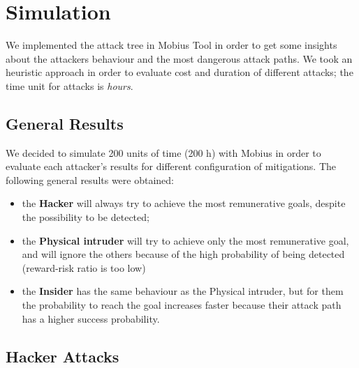 %
\chapter{Simulation}\label{ch:simulation}

We implemented the attack tree in Mobius Tool in order to get some insights about the
attackers behaviour and the most dangerous attack paths. 
We took an heuristic approach in order to evaluate cost and duration of different attacks; the time unit for attacks is \textit{hours}.
\section{General Results}
We decided to simulate 200 units of time (200 h) with Mobius in order to evaluate each attacker's results for 
different configuration of mitigations. The following general results were obtained:\\
\begin{itemize}
    \item the \textbf{Hacker} will always try to achieve the most remunerative goals, despite the
        possibility to be detected; 
    \item the \textbf{Physical intruder} will try to achieve only the most remunerative goal, and will
        ignore the others because of the high probability of being detected (reward-risk ratio is too low)
    \item the \textbf{Insider} has the same behaviour as the Physical intruder, but for them the probability
        to reach the goal increases faster because their attack path has a higher success probability.
\end{itemize}
\newpage
\section{Hacker Attacks}
